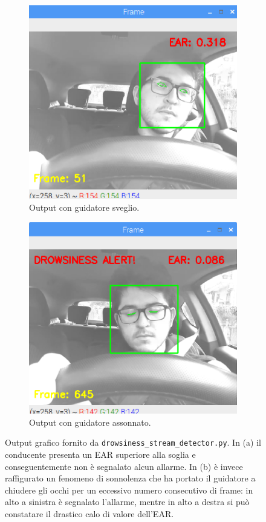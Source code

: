 \documentclass[12pt]{article}
\begin{document}
\begin{figure}
	\begin{subfigure}{.5\textwidth}
		\centering
		\includegraphics[width=.8\linewidth]{eps/gf_opened_eyes.eps}
		\caption{Output con guidatore sveglio.}
	\end{subfigure}
	\hspace{5mm}
	\begin{subfigure}{.5\textwidth}
		\centering
		\includegraphics[width=.8\linewidth]{eps/gf_closed_eyes.eps}
		\caption{Output con guidatore assonnato.}
	\end{subfigure}
	\caption{Output grafico fornito da \texttt{drowsiness\_stream\_detector.py}. In (a) il conducente presenta un EAR superiore alla soglia e conseguentemente non è segnalato alcun allarme. In (b) è invece raffigurato un fenomeno di sonnolenza che ha portato il guidatore a chiudere gli occhi per un eccessivo numero consecutivo di frame: in alto a sinistra è segnalato l'allarme, mentre in alto a destra si può constatare il drastico calo di valore dell'EAR.}
	\label{fig:drowsiness_output}
\end{figure}
\end{document}
